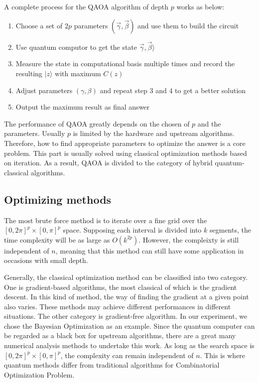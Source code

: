 \documentclass{./source/Report}
\begin{document}
A complete process for the QAOA algorithm of depth $p$ works as below:

\begin{enumerate}
    \item Choose a set of $2p$ parameters $(\vec{\gamma}, \vec{\beta})$ and use them to build the circuit
    \item Use quantum computor to get the state $\vec{\gamma}, \vec{\beta}\rangle$
    \item Measure the state in computational basis multiple times and record the resulting $|z\rangle$ with maximum $C(z)$ 
    \item Adjust parameters $(\gamma, \beta)$ and repeat step 3 and 4 to get a better solution
    \item Output the maximum result as final answer
\end{enumerate}

The performance of QAOA greatly depends on the chosen of $p$ and the parameters. Usually $p$ is limited 
by the hardware and upstream algorithms. Therefore, how to find appropriate parameters to optimize the answer is a core problem.
This part is usually solved using classical optimization methods based on iteration. 
As a result, QAOA is divided to the category of hybrid quantum-classical algorithms.

\subsection{Optimizing methods}

The most brute force method is  to iterate over a fine grid over the $[0, 2\pi]^p \times [0, \pi]^p$
space. Supposing each interval is divided into $k$ segments, the time complexity will be as large as 
$O(k^{2p})$. However, the compleixty is still independent of $n$, meaning that this method can still 
have some application in occasions with small depth.

Generally, the classical optimization method can be classified into two category. 
One is gradient-based algorithms, the most classical of which is the gradient descent. 
In this kind of method, the way of finding the gradient at a given point also varies. These methods
may achieve different performances in different situations. The other category is gradient-free algorithm.
In our experiment, we chose the Bayesian Optimization as an example. Since the quantum computer 
can be regarded as a black box for upstream algorithms, there are a great many numerical analysis methods 
to undertake this work. As long as the search space is $[0, 2\pi]^p \times [0, \pi]^p$, the complexity 
can remain independent of $n$. This is where quantum methods differ from traditional algorithms for Combinatorial Optimization Problem.
\end{document}
